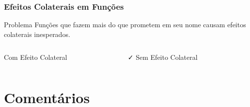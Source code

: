 \documentclass[aspectratio=169]{beamer}
\begin{document}
\begin{frame}
\frametitle{Efeitos Colaterais em Funções}

\begin{alertblock}{Problema}
Funções que fazem mais do que prometem em seu nome causam efeitos colaterais inesperados.
\end{alertblock}

\vspace{0.5cm}
\begin{columns}
\begin{column}{0.5\textwidth}
\begin{block}{\textcolor{cleanred}{\faTimes} Com Efeito Colateral}

\end{block}
\end{column}

\begin{column}{0.5\textwidth}
\begin{block}{\textcolor{cleangreen}{\faCheck} Sem Efeito Colateral}

\end{block}
\end{column}
\end{columns}
\end{frame}

\section{Comentários}
\end{document}
